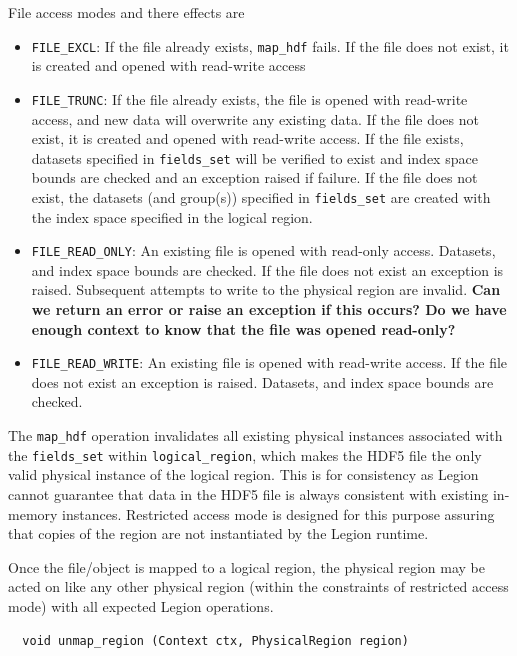 \documentclass{article}
\newcounter{todo}
\newcommand\ToDo[1]{\refstepcounter{todo}\marginpar{\color{red}{#1}}\addcontentsline{todo}{subsection}{#1~\thetodo}}%
\begin{document}
File access modes and there effects are
\begin{itemize}
  \item \lstinline{FILE_EXCL}: If the file already exists, \lstinline{map_hdf}
    fails. If the file does not exist, it is created and opened with
    read-write access
  \item \lstinline{FILE_TRUNC}: If the file already exists, the file is opened
    with read-write access, and new data will overwrite any existing data. If
    the file does not exist, it is created and opened with read-write
    access. If the file exists, datasets specified in \lstinline{fields_set} 
    will be verified to exist and index space bounds are checked and an
    exception raised if failure. If the file does not exist, the datasets (and
    group(s)) specified in
    \lstinline{fields_set} are created with the index space specified in
    the logical region.
  \item \lstinline{FILE_READ_ONLY}: An existing file is opened with read-only
    access. Datasets, and index space bounds are checked.  If the
    file does not exist an exception is raised. Subsequent 
    attempts to write to the physical region are 
    invalid. \textbf{Can we return an error or raise an exception if this
      occurs? Do we have enough context to know that the file was opened
      read-only?}
    \ToDo{Zhihao}
  \item \lstinline{FILE_READ_WRITE}: An existing file is opened with
    read-write access. If the file does not exist an exception is
    raised. Datasets, and index space bounds are checked.  
\end{itemize}


The \lstinline{map_hdf} operation invalidates all existing physical instances
associated with the \lstinline{fields_set} within
\lstinline{logical_region}, which makes the HDF5 file the only valid
physical instance of the logical region. This is for consistency as Legion
cannot guarantee that data in the HDF5 file is always consistent with existing
in-memory instances. Restricted access mode is designed for this purpose
assuring that copies of the region are not instantiated by the Legion
runtime.

Once the file/object is mapped to a logical region, the physical region may be
acted on like any other physical region (within the constraints of restricted
access mode) with all expected Legion operations.


\begin{lstlisting}
  void unmap_region (Context ctx, PhysicalRegion region)
\end{lstlisting}
\end{document}

